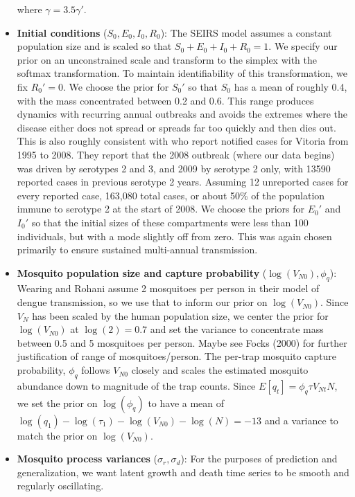 \documentclass[12pt,letterpaper]{article}
\begin{document}
\begin{itemize}
where $\gamma = 3.5\gamma'$.
\\
\item \textbf{Initial conditions} ($S_0, E_0, I_0, R_0$): The SEIRS model assumes a constant population size and is scaled so that $S_0+E_0+I_0+R_0 = 1$.
We specify our prior on an unconstrained scale and transform to the simplex with the softmax transformation.
To maintain identifiability of this transformation, we fix $R_0' = 0$.
We choose the prior for $S_0'$  so that $S_0$ has a mean of roughly  0.4, with the mass concentrated between 0.2 and 0.6.
This range produces dynamics with recurring annual outbreaks and avoids the extremes where the disease either does not spread or spreads far too quickly and then dies out.
This is also roughly consistent with \cite{Cardoso2011a} who report notified cases for Vitoria from 1995 to 2008. 
They report that the 2008 outbreak (where our data begins) was driven by serotypes 2 and 3, and 2009 by serotype 2 only, with 13590 reported cases in previous serotype 2 years.
Assuming 12 unreported cases for every reported case, 163,080 total cases, or about 50\% of the population immune to serotype 2 at the start of 2008.
We choose the priors for $E_0'$ and $I_0'$ so that the initial sizes of these compartments were less than 100 individuals, but with a mode slightly off from zero.
This was again chosen primarily to ensure sustained multi-annual transmission.
\\
\item \textbf{Mosquito population size and capture probability} ($\log(V_{N0}), \phi_q$): Wearing and Rohani \cite{Wearing2006} assume 2 mosquitoes per person in their model of dengue transmission, so we use that to inform our prior on $\log(V_{N0})$.
Since $V_{N}$ has been scaled by the human population size, we center the prior for $\log(V_{N0})$ at $\log(2) = 0.7$ and set the variance to concentrate mass between 0.5 and 5 mosquitoes per person.
Maybe see Focks (2000) for further justification of range of mosquitoes/person.
The per-trap mosquito capture probability, $\phi_q$ follows $V_{N0}$ closely and scales the estimated mosquito abundance down to magnitude of the trap counts.
Since $ E[q_t] = \phi_q \tau V_{Nt} N$, we set the prior on $\log(\phi_q)$ to have a mean of $\log(q_1) - \log(\tau_1) - \log(V_{N0}) - \log(N) = -13$ and a variance to match the prior on $\log(V_{N0})$.
\\
\item \textbf{Mosquito process variances} ($\sigma_r, \sigma_d$): For the purposes of prediction and generalization, we want latent growth and death time series to be smooth and regularly oscillating.

\end{itemize}
\end{document}

